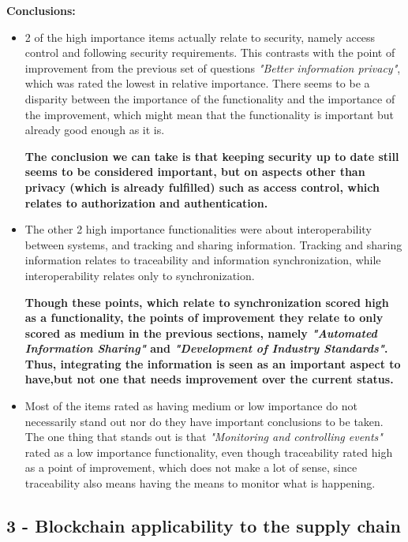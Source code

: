 \par \textbf{Conclusions: }
\begin{itemize}

    \item 2 of the high importance items actually relate to security, namely access control and following security requirements. This contrasts with the point of improvement from the previous set of questions \textit{"Better information privacy"}, which was rated the lowest in relative importance. There seems to be a disparity between the importance of the functionality and the importance of the improvement, which might mean that the functionality is important but already good enough as it is.
    
    \textbf{The conclusion we can take is that keeping security up to date still seems to be considered important, but on aspects other than privacy (which is already fulfilled) such as access control, which relates to authorization and authentication.}

    \item The other 2 high importance functionalities were about interoperability between systems, and tracking and sharing information. Tracking and sharing information relates to traceability and information synchronization, while interoperability relates only to synchronization.

    \textbf{Though these points, which relate to synchronization scored high as a functionality, the points of improvement they relate to only scored as medium in the previous sections, namely \textit{"Automated Information Sharing"} and \textit{"Development of Industry Standards"}. Thus, integrating the information is seen as an important aspect to have,but not one that needs improvement over the current status.}

\item Most of the items rated as having medium or low importance do not necessarily stand out nor do they have important conclusions to be taken. The one thing that stands out is that \textit{"Monitoring and controlling events"} rated as a low importance functionality, even though traceability rated high as a point of improvement, which does not make a lot of sense, since traceability also means having the means to monitor what is happening.


\end{itemize}


\subsection*{3 - Blockchain applicability to the supply chain}
 
